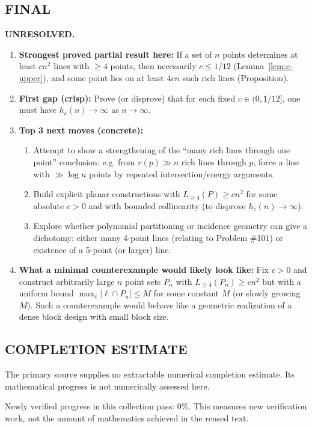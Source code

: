 \subsection*{FINAL}
\textbf{UNRESOLVED.}
\begin{enumerate}[label=(\roman*),leftmargin=2.5em]
\item \textbf{Strongest proved partial result here:}
If a set of $n$ points determines at least $c n^2$ lines with $\ge 4$ points, then necessarily $c\le 1/12$ (Lemma~\ref{lem:c-upper}), and some point lies on at least $4c n$ such rich lines (Proposition).
\item \textbf{First gap (crisp):}
Prove (or disprove) that for each fixed $c\in(0,1/12]$, one must have $h_c(n)\to\infty$ as $n\to\infty$.
\item \textbf{Top 3 next moves (concrete):}
\begin{enumerate}[label=(\alph*),leftmargin=2.5em]
\item Attempt to show a strengthening of the ``many rich lines through one point'' conclusion: e.g. from $r(p)\gg n$ rich lines through $p$, force a line with $\gg \log n$ points by repeated intersection/energy arguments.
\item Build explicit planar constructions with $L_{\ge 4}(P)\ge c n^2$ for some absolute $c>0$ and with bounded collinearity (to disprove $h_c(n)\to\infty$).
\item Explore whether polynomial partitioning or incidence geometry can give a dichotomy: either many 4-point lines (relating to Problem \#101) or existence of a 5-point (or larger) line.
\end{enumerate}
\item \textbf{What a minimal counterexample would likely look like:}
Fix $c>0$ and construct arbitrarily large $n$ point sets $P_n$ with $L_{\ge 4}(P_n)\ge c n^2$ but with a uniform bound $\max_{\ell}|\ell\cap P_n|\le M$ for some constant $M$ (or slowly growing $M$). Such a counterexample would behave like a geometric realization of a dense block design with small block size.
\end{enumerate}



\subsection*{COMPLETION ESTIMATE}
The primary source supplies no extractable numerical completion estimate. Its mathematical progress is not numerically assessed here.

Newly verified progress in this collection pass: $0\%$. This measures new verification work, not the amount of mathematics achieved in the reused text.
